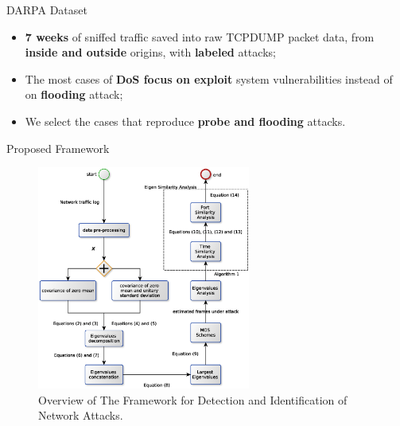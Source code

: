 \documentclass[newPxFont, numfooter, sectionpages]{beamer}
\begin{document}
\begin{frame}{DARPA Dataset}
	
	\begin{itemize}
		\item \textbf{7 weeks} of sniffed traffic saved into raw TCPDUMP packet data, from \textbf{inside and outside} origins, with \textbf{labeled} attacks;
		\item The most cases of \textbf{DoS focus on exploit} system vulnerabilities instead of on \textbf{flooding} attack;
		\item We select the cases that reproduce \textbf{probe and flooding} attacks.
	\end{itemize}

\end{frame}
\begin{frame}{Proposed Framework}
	
	\begin{figure}[h!]
		\centering
	     \includegraphics[width=7cm]{../figures/mos_eigen_similarity.eps}
	     \caption{Overview of The Framework for Detection and Identification of Network Attacks.}
	     \label{fig:2_fig80}
	\end{figure}

\end{frame}
	
\end{document}
